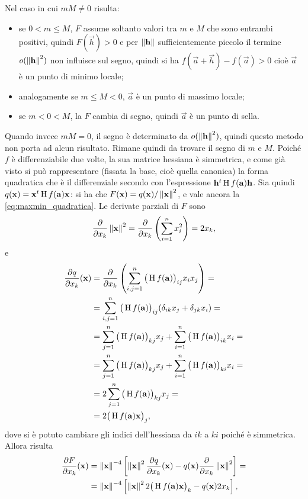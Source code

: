 Nel caso in cui $mM\neq 0$ risulta:
\begin{itemize}
\item se $0<m\leq M$, $F$ assume soltanto valori tra $m$ e $M$ che sono entrambi positivi, quindi $F(\vec h)>0$ e per $\left\|{\mathbf{h}}\right\|$ sufficientemente piccolo il termine $o(\left\|{\mathbf{h}}\right\|^2)$ non influisce sul segno, quindi si ha $f(\vec a+\vec h)-f(\vec a)>0$ cioè $\vec a$ è un punto di minimo locale;
\item analogamente se $m\leq M<0$, $\vec a$ è un punto di massimo locale;
\item se $m<0<M$, la $F$ cambia di segno, quindi $\vec a$ è un punto di sella.
\end{itemize}
Quando invece $mM=0$, il segno è determinato da $o(\left\|{\mathbf{h}}\right\|^2)$, quindi questo metodo non porta ad alcun risultato.
Rimane quindi da trovare il segno di $m$ e $M$. Poiché $f$ è differenziabile due volte, la sua matrice hessiana è simmetrica, e come già visto si può rappresentare (fissata la base, cioè quella canonica) la forma quadratica che è il differenziale secondo con l'espressione $\mathbf{h}^t\operatorname{H} f(\mathbf{a})\mathbf{h}$. Sia quindi $q(\mathbf{x})=\mathbf{x}^t\operatorname{H} f(\mathbf{a})\mathbf{x}$: si ha che $F(\mathbf{x})=q(\mathbf{x})/\left\|{\mathbf{x}}\right\|^2$, e vale ancora la \eqref{eq:maxmin_quadratica}.
Le derivate parziali di $F$ sono
\[
\frac{\partial {}}{\partial {x_k}}\left\|{\mathbf{x}}\right\|^2=\frac{\partial {}}{\partial {x_k}}\left(\sum_{i=1}^nx_i^2\right)=2x_k,
\]
e
\[\begin{split}
\frac{\partial {q}}{\partial {x_k}}(\mathbf{x})	&=\frac{\partial {}}{\partial {x_k}}\left(\sum_{i,j=1}^n\big(\operatorname{H} f(\mathbf{a})\big)_{ij}x_ix_j\right)=\\
					&=\sum_{i,j=1}^n\big(\operatorname{H} f(\mathbf{a})\big)_{ij}(\delta_{ik}x_j+\delta_{jk}x_i)=\\
					&=\sum_{j=1}^n\big(\operatorname{H} f(\mathbf{a})\big)_{kj}x_j+\sum_{i=1}^n\big(\operatorname{H} f(\mathbf{a})\big)_{ik}x_i=\\
					&=\sum_{j=1}^n\big(\operatorname{H} f(\mathbf{a})\big)_{kj}x_j+\sum_{i=1}^n\big(\operatorname{H} f(\mathbf{a})\big)_{ki}x_i=\\
					&=2\sum_{j=1}^n\big(\operatorname{H} f(\mathbf{a})\big)_{kj}x_j=\\
					&=2\big(\operatorname{H} f(\mathbf{a})\mathbf{x}\big)_j,
\end{split}\]
dove si è potuto cambiare gli indici dell'hessiana da $ik$ a $ki$ poiché è simmetrica.
Allora risulta
\[\begin{split}
\frac{\partial {F}}{\partial {x_k}}(\mathbf{x})	&=\left\|{\mathbf{x}}\right\|^{-4}\left[\left\|{\mathbf{x}}\right\|^2\frac{\partial {q}}{\partial {x_k}}(\mathbf{x})-q(\mathbf{x})\frac{\partial {}}{\partial {x_k}}\left\|{\mathbf{x}}\right\|^2\right]=\\
					&=\left\|{\mathbf{x}}\right\|^{-4}\left[\left\|{\mathbf{x}}\right\|^22\big(\operatorname{H} f(\mathbf{a})\mathbf{x}\big)_k-q(\mathbf{x})2x_k\right],
\end{split}\]
